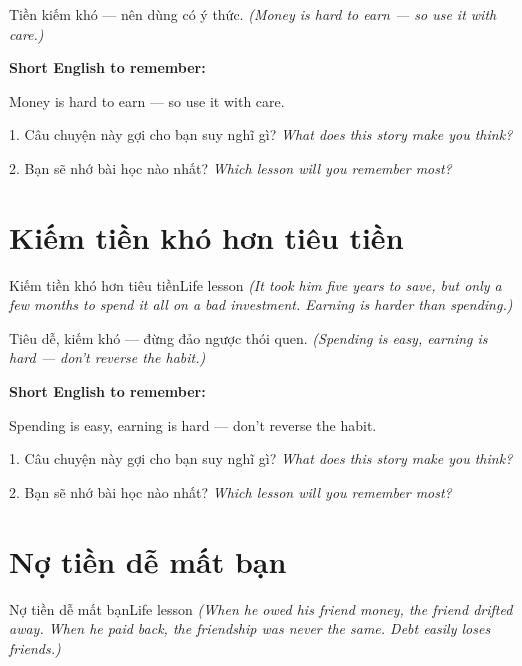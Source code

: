 \begin{baihoc}
Tiền kiếm khó — nên dùng có ý thức.
\textit{(Money is hard to earn — so use it with care.)}
\end{baihoc}

\begin{ghinhoanh}
\textbf{Short English to remember:}

Money is hard to earn — so use it with care.

\end{ghinhoanh}

\begin{tuhocnhanh}
1. Câu chuyện này gợi cho bạn suy nghĩ gì? \textit{What does this story make you think?}

2. Bạn sẽ nhớ bài học nào nhất? \textit{Which lesson will you remember most?}
\end{tuhocnhanh}
\ngancach


\section{Kiếm tiền khó hơn tiêu tiền}
\begin{truyen}{Kiếm tiền khó hơn tiêu tiền}{Life lesson}
\textit{(It took him five years to save, but only a few months to spend it all on a bad investment. Earning is harder than spending.)}
\end{truyen}

\begin{baihoc}
Tiêu dễ, kiếm khó — đừng đảo ngược thói quen.
\textit{(Spending is easy, earning is hard — don't reverse the habit.)}
\end{baihoc}

\begin{ghinhoanh}
\textbf{Short English to remember:}

Spending is easy, earning is hard — don't reverse the habit.

\end{ghinhoanh}

\begin{tuhocnhanh}
1. Câu chuyện này gợi cho bạn suy nghĩ gì? \textit{What does this story make you think?}

2. Bạn sẽ nhớ bài học nào nhất? \textit{Which lesson will you remember most?}
\end{tuhocnhanh}
\ngancach


\section{Nợ tiền dễ mất bạn}
\begin{truyen}{Nợ tiền dễ mất bạn}{Life lesson}
\textit{(When he owed his friend money, the friend drifted away. When he paid back, the friendship was never the same. Debt easily loses friends.)}
\end{truyen}

